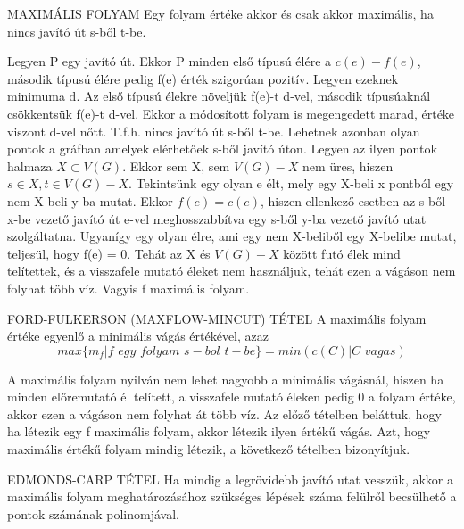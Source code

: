 \begin{tetel}{MAXIMÁLIS FOLYAM}
Egy folyam értéke akkor és csak akkor maximális, ha nincs javító út s-ből t-be.
\end{tetel}

\begin{bizonyitas}{}
Legyen P egy javító út. Ekkor P minden első típusú élére a $c(e) - f(e)$, második típusú élére pedig f(e) érték szigorúan pozitív. Legyen ezeknek minimuma d. Az első típusú élekre növeljük f(e)-t d-vel, második típusúaknál csökkentsük f(e)-t d-vel. Ekkor a módosított folyam is megengedett marad, értéke viszont d-vel nőtt. T.f.h. nincs javító út s-ből t-be. Lehetnek azonban olyan pontok a gráfban amelyek elérhetőek s-ből javító úton. Legyen az ilyen pontok halmaza $X \subset V(G)$. Ekkor sem X, sem $V(G) - X$ nem üres, hiszen $s \in X, t\in V(G) - X$. Tekintsünk egy olyan e élt, mely egy X-beli x pontból egy nem X-beli y-ba mutat. Ekkor $f(e) = c(e)$, hiszen ellenkező esetben az s-ből x-be vezető javító út e-vel meghosszabbítva egy s-ből y-ba vezető javító utat szolgáltatna. Ugyanígy egy olyan élre, ami egy nem X-beliből egy X-belibe mutat, teljesül, hogy f(e) = 0. Tehát az X és $V(G) - X$ között futó élek mind telítettek, és a visszafele mutató éleket nem használjuk, tehát ezen a vágáson nem folyhat több víz. Vagyis f maximális folyam.
\end{bizonyitas}

\begin{tetel}{FORD-FULKERSON (MAXFLOW-MINCUT) TÉTEL}
A maximális folyam értéke egyenlő a minimális vágás értékével, azaz
$$max\{m_f|f\,\,egy\,\,folyam\,\,s-bol\,\,t-be\} = min(c(C)|C\,\,vagas)$$
\end{tetel}

\begin{bizonyitas}{}
A maximális folyam nyilván nem lehet nagyobb a minimális vágásnál, hiszen ha minden előremutató él telített, a visszafele mutató éleken pedig 0 a folyam értéke, akkor ezen a vágáson nem folyhat át több víz. Az előző tételben beláttuk, hogy ha létezik egy f maximális folyam, akkor létezik ilyen értékű vágás. Azt, hogy maximális értékű folyam mindig létezik, a következő tételben bizonyítjuk.
\end{bizonyitas}

\begin{tetel}{EDMONDS-CARP TÉTEL}
Ha mindig a legrövidebb javító utat vesszük, akkor a maximális folyam meghatározásához szükséges lépések száma felülről becsülhető a pontok számának polinomjával.
\end{tetel}

